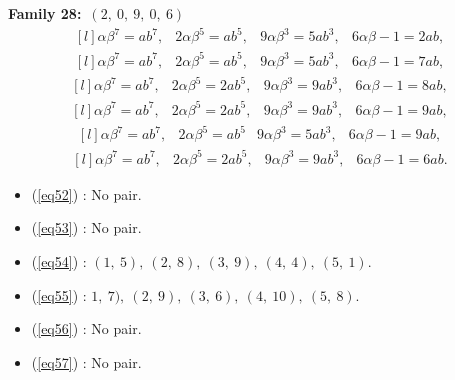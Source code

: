 \documentclass[12pt,a4wide, reqno]{amsart}
\theoremstyle{definition}
\theoremstyle{remark}
\numberwithin{equation}{section}
\begin{document}
     \textbf{Family 28:}~$(2,~0,~9,~0,~6)$ 
\begin{equation}\label{eq52}
    \begin{matrix*}[l]
         \alpha \beta ^7=ab^7, & 2\alpha \beta ^5=ab^5, & 9\alpha \beta ^3=5ab ^3, & 6\alpha\beta-1=2ab,
    \end{matrix*}
\end{equation}
\begin{equation}\label{eq53}
    \begin{matrix*}[l]
          \alpha \beta ^7=ab^7, & 2\alpha \beta ^5=ab^5, & 9\alpha \beta ^3=5ab ^3, & 6\alpha\beta-1=7ab,
    \end{matrix*}
\end{equation}
\begin{equation}\label{eq54}
    \begin{matrix*}[l]
          \alpha \beta ^7=ab^7, & 2\alpha \beta ^5=2ab^5, & 9\alpha \beta ^3=9ab ^3, & 6\alpha\beta-1=8ab,
    \end{matrix*}
\end{equation}
\begin{equation}\label{eq55}
    \begin{matrix*}[l]
          \alpha \beta ^7=ab^7, & 2\alpha \beta ^5=2ab^5, & 9\alpha \beta ^3=9ab^3, & 6\alpha\beta-1=9ab,
    \end{matrix*}
\end{equation}
\begin{equation}\label{eq56}
    \begin{matrix*}[l]
          \alpha \beta ^7=ab^7, & 2\alpha \beta ^5=ab^5 & 9\alpha \beta ^3=5ab ^3, & 6\alpha\beta-1=9ab,
    \end{matrix*}
\end{equation}
\begin{equation}\label{eq57}
    \begin{matrix*}[l]
          \alpha \beta ^7=ab^7, & 2\alpha \beta ^5=2ab^5, & 9\alpha \beta ^3=9ab ^3, & 6\alpha\beta-1=6ab.
    \end{matrix*}
\end{equation}

\begin{itemize}
    \item 
    (\ref{eq52}) : No pair.
    \item 
    (\ref{eq53}) : No pair.
    \item 
    (\ref{eq54}) : $(1,~5),~(2,~8),~(3,~9),~(4,~4),~(5,~1).$
    \item 
    (\ref{eq55}) : $1,~7),~(2,~9),~(3,~6),~(4,~10),~(5,~8).$
    \item 
    (\ref{eq56}) : No pair.
    \item
    (\ref{eq57}) : No pair.
    \end{itemize}
    
\end{document}
